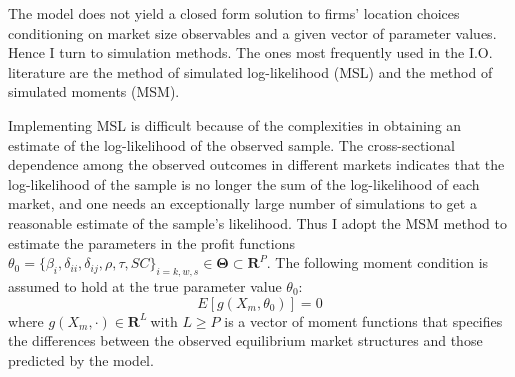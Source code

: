 \documentclass[notitlepage,onecolumn,11pt]{article}
\begin{document}
The model does not yield a closed form solution to firms' location choices
conditioning on market size observables and a given vector of parameter
values. Hence I turn to simulation methods. The ones most frequently used in
the I.O. literature are the method of simulated log-likelihood (MSL) and the
method of simulated moments (MSM).

Implementing MSL is difficult because of the complexities in obtaining an
estimate of the log-likelihood of the observed sample. The cross-sectional
dependence among the observed outcomes in different markets indicates that
the log-likelihood of the sample is no longer the sum of the log-likelihood
of each market, and one needs an exceptionally large number of simulations
to get a reasonable estimate of the sample's likelihood. Thus I adopt the
MSM method to estimate the parameters in the profit functions $\theta
_{0}=\{\beta _{i},\delta _{ii},\delta _{ij},\rho ,\tau ,SC\}_{i=k,w,s}\in 
\mathbf{\Theta \subset R}^{P}.$ The following moment condition is assumed to
hold at the true parameter value $\theta _{0}$:%
\begin{equation*}
E[g(X_{m},\theta _{0})]=0
\end{equation*}%
where $g(X_{m},\cdot )\in \mathbf{R}^{L}~$with $L\geq P$ is a vector of
moment functions that specifies the differences between the observed
equilibrium market structures and those predicted by the model.
\end{document}
